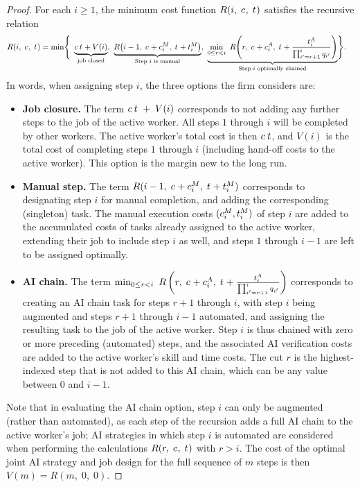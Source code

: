 \begin{proof}
For each $i \geq 1$, the minimum cost function $R(i,\; c_{},\; t_{})$ satisfies the recursive relation
\begin{align*}
R(i,\; \skillcost{},\; \timecost{}) = \min\Biggl\{
& \ \underbrace{\skillcost{}\,\timecost{} + V(i)}_{\text{job closed}}, \ \underbrace{R\bigl(i-1,\; \skillcost{} + \manualSkill{i},\; \timecost{} + \manualTime{i}\bigr)}_{\text{Step $i$ is manual}}, \ \underbrace{\min_{0 \le r < i}\ R\!\left(r,\; \skillcost{} + \AIskill{i},\; \timecost{} + \frac{\AItime{i}}{\prod_{i'=r+1}^{i} q_{i'}}\right)}_{\text{Step $i$ optimally chained}}
\Biggr\}.
\end{align*}
In words, when assigning step $i$, the three options the firm considers are:
\begin{itemize}
    \item \textbf{Job closure.}
    The term $c_{}\,t_{} \; + \; V(i)$ corresponds to not adding any further steps to the job of the active worker.
    All steps $1$ through $i$ will be completed by other workers.
    The active worker's total cost is then $c_{}\,t_{}$, and $V(i)$ is the total cost of completing steps $1$ through $i$ (including hand-off costs to the active worker).
    This option is the margin new to the long run.

    \item \textbf{Manual step.}
    The term $R(i-1,\; c_{} + c^{M}_{i},\; t_{} + t^{M}_{i})$ corresponds to designating step $i$ for manual completion, and adding the corresponding (singleton) task.
    The manual execution costs $(c^{M}_{i}, t^{M}_{i})$ of step $i$ are added to the accumulated costs of tasks already assigned to the active worker, extending their job to include step $i$ as well, and steps $1$ through $i-1$ are left to be assigned optimally.

    \item \textbf{AI chain.}
    The term $\min_{0 \le r < i} \ R\left(r,\; c_{} + c^{A}_{i},\; t_{} + \frac{t^{A}_{i}}{\prod_{i'=r+1}^{i} q_{i'}}\right)$ corresponds to creating an AI chain task for steps $r+1$ through $i$, with step $i$ being augmented and steps $r+1$ through $i-1$ automated, and assigning the resulting task to the job of the active worker.
    Step $i$ is thus chained with zero or more preceding (automated) steps, and the associated AI verification costs are added to the active worker's skill and time costs.
    The cut $r$ is the highest-indexed step that is not added to this AI chain, which can be any value between $0$ and $i-1$.
\end{itemize}
Note that in evaluating the AI chain option, step $i$ can only be augmented (rather than automated), as each step of the recursion adds a full AI chain to the active worker's job; AI strategies in which step $i$ is automated are considered when performing the calculations $R(r,\; c_{},\; t_{})$ with $r > i$.
The cost of the optimal joint AI strategy and job design for the full sequence of $m$ steps is then $V(m) = R(m,\; 0,\; 0)$.


\end{proof}
